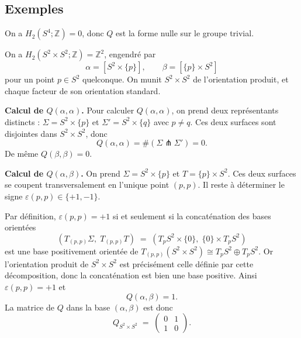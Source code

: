 \subsection{Exemples}

\begin{exemple}[$S^4$]
On a $H_2(S^4;\mathbb{Z}) = 0$, donc $Q$ est la forme nulle sur le groupe
trivial.
\end{exemple}

\begin{exemple}[$S^2 \times S^2$]
On a $H_2(S^2 \times S^2;\mathbb{Z}) = \mathbb{Z}^2$, engendré par
\[
  \alpha = [S^2 \times \{p\}], \qquad \beta = [\{p\} \times S^2]
\]
pour un point $p \in S^2$ quelconque. On munit $S^2 \times S^2$ de
l'orientation produit, et chaque facteur de son orientation standard.

\medskip
\noindent\textbf{Calcul de $Q(\alpha,\alpha)$.}
Pour calculer $Q(\alpha,\alpha)$, on prend deux représentants distincts :
$\Sigma = S^2 \times \{p\}$ et $\Sigma' = S^2 \times \{q\}$ avec $p \neq q$.
Ces deux surfaces sont disjointes dans $S^2 \times S^2$, donc
\[
  Q(\alpha, \alpha) = \#(\Sigma \pitchfork \Sigma') = 0.
\]
De même $Q(\beta,\beta) = 0$.

\medskip
\noindent\textbf{Calcul de $Q(\alpha,\beta)$.}
On prend $\Sigma = S^2 \times \{p\}$ et $T = \{p\} \times S^2$. Ces deux
surfaces se coupent transversalement en l'unique point $(p,p)$. Il reste à
déterminer le signe $\varepsilon(p,p) \in \{+1,-1\}$.

Par définition, $\varepsilon(p,p) = +1$ si et seulement si la concaténation
des bases orientées
\[
  (T_{(p,p)}\Sigma,\; T_{(p,p)}T)
  \;=\;
  (T_p S^2 \times \{0\},\; \{0\} \times T_p S^2)
\]
est une base positivement orientée de $T_{(p,p)}(S^2 \times S^2) \cong T_p S^2
\oplus T_p S^2$. Or l'orientation produit de $S^2 \times S^2$ est précisément
celle définie par cette décomposition, donc la concaténation est bien une base
positive. Ainsi $\varepsilon(p,p) = +1$ et
\[
  Q(\alpha,\beta) = 1.
\]
La matrice de $Q$ dans la base $(\alpha,\beta)$ est donc
\[
  Q_{S^2 \times S^2} \;=\; \begin{pmatrix} 0 & 1 \\ 1 & 0 \end{pmatrix}.
\]
\end{exemple}

